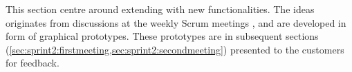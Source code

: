 This section centre around extending \launcher with new functionalities.
The ideas originates from discussions at the weekly Scrum meetings , and are developed in form of graphical prototypes.
These prototypes are in subsequent sections (\cref{sec:sprint2:firstmeeting,sec:sprint2:secondmeeting}) presented to the customers for feedback.